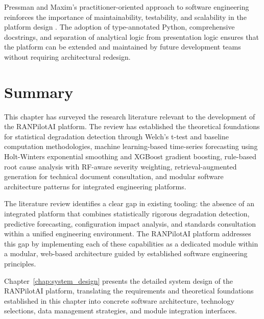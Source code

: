 Pressman and Maxim's practitioner-oriented approach to software engineering reinforces the importance of maintainability, testability, and scalability in the platform design \cite{pressman2014}. The adoption of type-annotated Python, comprehensive docstrings, and separation of analytical logic from presentation logic ensures that the platform can be extended and maintained by future development teams without requiring architectural redesign.

\section{Summary}

This chapter has surveyed the research literature relevant to the development of the RANPilotAI platform. The review has established the theoretical foundations for statistical degradation detection through Welch's t-test and baseline computation methodologies, machine learning-based time-series forecasting using Holt-Winters exponential smoothing and XGBoost gradient boosting, rule-based root cause analysis with RF-aware severity weighting, retrieval-augmented generation for technical document consultation, and modular software architecture patterns for integrated engineering platforms.

The literature review identifies a clear gap in existing tooling: the absence of an integrated platform that combines statistically rigorous degradation detection, predictive forecasting, configuration impact analysis, and standards consultation within a unified engineering environment. The RANPilotAI platform addresses this gap by implementing each of these capabilities as a dedicated module within a modular, web-based architecture guided by established software engineering principles.

Chapter~\ref{chap:system_design} presents the detailed system design of the RANPilotAI platform, translating the requirements and theoretical foundations established in this chapter into concrete software architecture, technology selections, data management strategies, and module integration interfaces.
